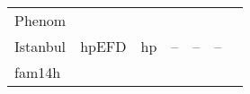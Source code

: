 \begin{tabular}{|l||c|c|c|c|c|c|}
Phenom		&
\multirow{3}{*}{hpEFD}	& %
\multirow{3}{*}{hp}	& %
\multirow{3}{*}{--}	& %
\multirow{3}{*}{--} 	& %
\multirow{3}{*}{--}	\\ %

Istanbul		&
			& %
			& %
			& %
			& %
			\\ %

fam14h			&
			& %
			& %
			& %
			& %
			\\ %
\hline

\end{tabular}



